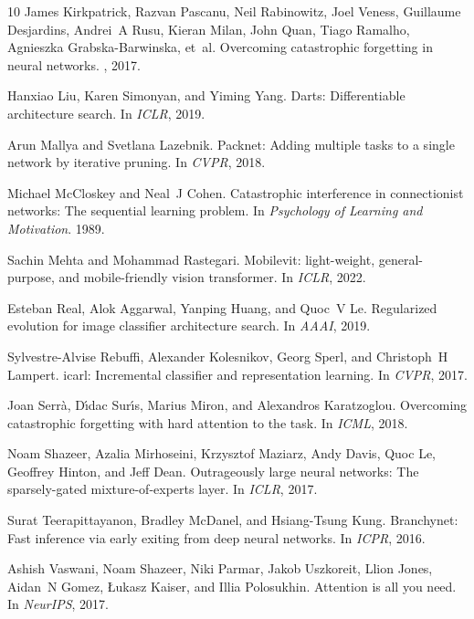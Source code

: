 \documentclass[11pt, a4paper]{article}
\begin{document}
\begin{thebibliography}{10}
James Kirkpatrick, Razvan Pascanu, Neil Rabinowitz, Joel Veness, Guillaume Desjardins, Andrei~A Rusu, Kieran Milan, John Quan, Tiago Ramalho, Agnieszka Grabska-Barwinska, et~al.
\newblock Overcoming catastrophic forgetting in neural networks.
, 2017.

Hanxiao Liu, Karen Simonyan, and Yiming Yang.
\newblock Darts: Differentiable architecture search.
\newblock In {\em ICLR}, 2019.

Arun Mallya and Svetlana Lazebnik.
\newblock Packnet: Adding multiple tasks to a single network by iterative pruning.
\newblock In {\em CVPR}, 2018.

Michael McCloskey and Neal~J Cohen.
\newblock Catastrophic interference in connectionist networks: The sequential learning problem.
\newblock In {\em Psychology of Learning and Motivation}. 1989.

Sachin Mehta and Mohammad Rastegari.
\newblock Mobilevit: light-weight, general-purpose, and mobile-friendly vision transformer.
\newblock In {\em ICLR}, 2022.

Esteban Real, Alok Aggarwal, Yanping Huang, and Quoc~V Le.
\newblock Regularized evolution for image classifier architecture search.
\newblock In {\em AAAI}, 2019.

Sylvestre-Alvise Rebuffi, Alexander Kolesnikov, Georg Sperl, and Christoph~H Lampert.
\newblock icarl: Incremental classifier and representation learning.
\newblock In {\em CVPR}, 2017.

Joan Serr{\`a}, D{\'\i}dac Sur{\'\i}s, Marius Miron, and Alexandros Karatzoglou.
\newblock Overcoming catastrophic forgetting with hard attention to the task.
\newblock In {\em ICML}, 2018.

Noam Shazeer, Azalia Mirhoseini, Krzysztof Maziarz, Andy Davis, Quoc Le, Geoffrey Hinton, and Jeff Dean.
\newblock Outrageously large neural networks: The sparsely-gated mixture-of-experts layer.
\newblock In {\em ICLR}, 2017.

Surat Teerapittayanon, Bradley McDanel, and Hsiang-Tsung Kung.
\newblock Branchynet: Fast inference via early exiting from deep neural networks.
\newblock In {\em ICPR}, 2016.

Ashish Vaswani, Noam Shazeer, Niki Parmar, Jakob Uszkoreit, Llion Jones, Aidan~N Gomez, {\L}ukasz Kaiser, and Illia Polosukhin.
\newblock Attention is all you need.
\newblock In {\em NeurIPS}, 2017.


\end{thebibliography}
\end{document}
